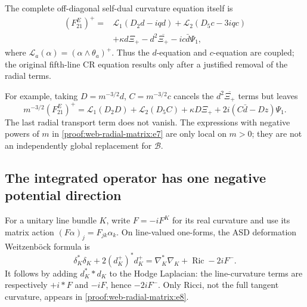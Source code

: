 The complete off-diagonal self-dual curvature equation itself is \[
 \begin{aligned}
 (F^E_{21})^+={}&\mathcal L_1(D_2d-iqd)
              +\mathcal L_2(D_5c-3iqc)\\
 &+\kappa d\Xi_+-d^2\overline{\Xi_+}
              -ic\bar d\Psi_1,
 \end{aligned}
 \tag{\thesection.6}\label{proof:web-radial-matrix:e6}
\] where \(\mathcal L_a(\alpha)=(\alpha\wedge\theta_a)^+\). Thus the \(d\)-equation and \(c\)-equation are coupled; the original fifth-line CR equation results only after a justified removal of the radial terms.

For example, taking \(D=m^{-3/2}d\), \(C=m^{-3/2}c\) cancels the \(d^2\overline{\Xi_+}\) terms but leaves \[
 m^{-3/2}(F^E_{21})^+
 =\mathcal L_1(D_2D)+\mathcal L_2(D_5C)
       +\kappa D\Xi_+ +2i(C\bar d-Dz)\Psi_1.
 \tag{\thesection.7}\label{proof:web-radial-matrix:e7}
\] The last radial transport term does not vanish. The expressions with negative powers of \(m\) in \eqref{proof:web-radial-matrix:e7} are only local on \(m>0\); they are not an independently global replacement for \(\mathcal B\).

\hypertarget{proof:web-radial-matrix:s3}{%
\subsection{The integrated operator has one negative potential direction}\label{proof:web-radial-matrix:s3}}

For a unitary line bundle \(K\), write \(F=-iF^K\) for its real curvature and use its matrix action \((F\alpha)_j=F_{jk}\alpha_k\). On line-valued one-forms, the ASD deformation Weitzenböck formula is \[
 \delta_K^*\delta_K+2(d_K^+)^*d_K^+
 =\nabla_K^*\nabla_K+\operatorname{Ric}-2iF^-.
 \tag{\thesection.8}\label{proof:web-radial-matrix:e8}
\] It follows by adding \(d_K^**d_K\) to the Hodge Laplacian: the line-curvature terms are respectively \(+i*F\) and \(-iF\), hence \(-2iF^-\). Only Ricci, not the full tangent curvature, appears in \eqref{proof:web-radial-matrix:e8}.

